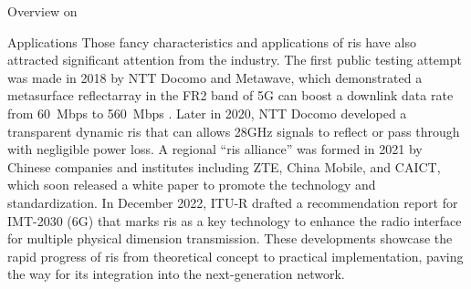 \begin{section}{Overview on }
\begin{subsection}{Applications}
		Those fancy characteristics and applications of \gls{ris} have also attracted significant attention from the industry.
		The first public testing attempt was made in 2018 by NTT Docomo and Metawave, which demonstrated a metasurface reflectarray in the FR2 band of 5G can boost a downlink data rate from \qty{60}{Mbps} to \qty{560}{Mbps} \cite{Liu2022b}.
		Later in 2020, NTT Docomo developed a transparent dynamic \gls{ris} that can allows 28GHz signals to reflect or pass through with negligible power loss.
		A regional ``\gls{ris} alliance'' was formed in 2021 by Chinese companies and institutes including ZTE, China Mobile, and CAICT, which soon released a white paper \cite{Rista2023} to promote the technology and standardization.
		In December 2022, ITU-R drafted a recommendation report for IMT-2030 (6G) \cite{Itu2022} that marks \gls{ris} as a key technology to enhance the radio interface for multiple physical dimension transmission.
		These developments showcase the rapid progress of \gls{ris} from theoretical concept to practical implementation, paving the way for its integration into the next-generation network.
	\end{subsection}
\end{section}

